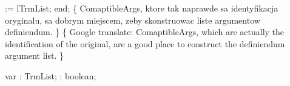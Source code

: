     := lTrmList;
end;
\eatline
{}\nwendcode{}\nwdocspar
\nwenddocs{}\endmoddef\nwstartdeflinemarkup{}\nwenddeflinemarkup
\{ ComaptibleArgs, ktore tak naprawde sa identyfikacja oryginalu, sa
  dobrym miejscem, zeby skonstruowac liste argumentow definiendum.
\}
\{ Google translate:
  ComaptibleArgs, which are actually the identification of the original,
  are a good place to construct the definiendum argument list. \}

var : TrmList;
    : boolean;


